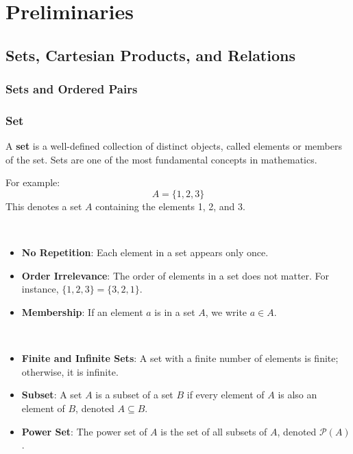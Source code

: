 \chapter{Preliminaries}
\section{Sets, Cartesian Products, and Relations}

\subsection{Sets and Ordered Pairs}

\subsection*{Set}

A \textbf{set} is a well-defined collection of distinct objects, called elements or members of the set. Sets are one of the most fundamental concepts in mathematics.

\begin{example}
For example:
\[
A = \{1, 2, 3\}
\]
This denotes a set \(A\) containing the elements 1, 2, and 3.
\end{example}
\vspace{12pt}
\begin{note}[Properties]
\ \begin{itemize}
	\item \textbf{No Repetition}: Each element in a set appears only once.
	\item \textbf{Order Irrelevance}: The order of elements in a set does not matter. For instance, \(\{1, 2, 3\} = \{3, 2, 1\}\).
	\item \textbf{Membership}: If an element \(a\) is in a set \(A\), we write \(a \in A\).
\end{itemize}
\end{note}
\vspace{12pt}
\begin{note}
\ \begin{itemize}
	\item \textbf{Finite and Infinite Sets}: A set with a finite number of elements is finite; otherwise, it is infinite.
	\item \textbf{Subset}: A set \(A\) is a subset of a set \(B\) if every element of \(A\) is also an element of \(B\), denoted \(A \subseteq B\).
	\item \textbf{Power Set}: The power set of \(A\) is the set of all subsets of \(A\), denoted \(\mathcal{P}(A)\).
\end{itemize}
\end{note}

